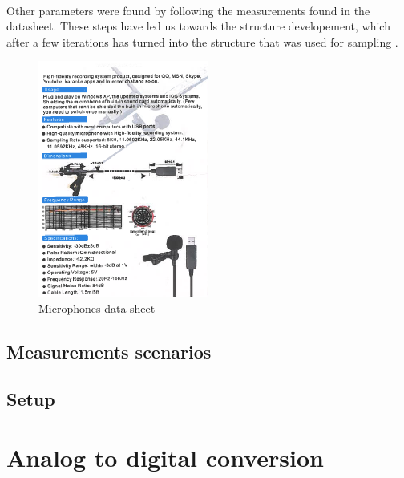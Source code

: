 \paragraph{}
Other parameters were found by following the measurements found in the datasheet. These steps have led us towards the structure developement, which after a few iterations has turned into the structure that was used for sampling .
\begin{figure} [htp] 
  \centering
    \includegraphics[width=0.5\textwidth]{Illustrations/MicData}
    \caption{Microphones data sheet}
    \label{fig:MicData}
\end{figure}


\subsection{Measurements scenarios}

\subsection{Setup}
\section{Analog to digital conversion}



